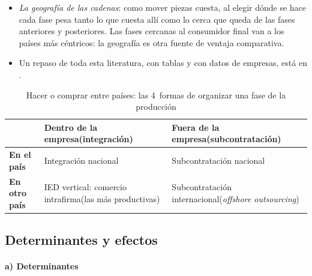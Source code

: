 \documentclass[11pt]{article}
\begin{document}
\begin{itemize}
\item \emph{La geografía de las cadenas}: como mover piezas cuesta, al elegir dónde se hace cada fase pesa tanto lo que cuesta allí como lo cerca que queda de las fases anteriores y posteriores. Las fases cercanas al consumidor final van a los países más céntricos: la geografía es otra fuente de ventaja comparativa\nocite{AntrasGortari2020}.
\item Un repaso de toda esta literatura, con tablas y con datos de empresas, está en \textcite{AntrasChor2022}.
\end{itemize}

\begin{table}[H]
\centering
\caption{Hacer o comprar entre países: las 4~formas de organizar una fase de la producción}\label{tab:formas-organizacion}
\small
\begin{tabular}{>{\centering\arraybackslash}m{3.2cm}>{\centering\arraybackslash}m{5.2cm}>{\centering\arraybackslash}m{5.2cm}}
\toprule
\rowcolor{tceeazulpalido} & \textbf{Dentro de la empresa}\newline (integración) & \textbf{Fuera de la empresa}\newline (subcontratación) \\
\midrule
\textbf{En el país} & Integración nacional & Subcontratación nacional \\
\addlinespace
\textbf{En otro país} & \cellcolor{tceesalvia}IED vertical: comercio intrafirma\newline (las más productivas) & Subcontratación internacional\newline (\emph{offshore outsourcing}) \\
\bottomrule
\end{tabular}
\end{table}

\subsection{Determinantes y efectos}\label{sec:cgv-efectos}

\paragraph{a) Determinantes}
\end{document}
